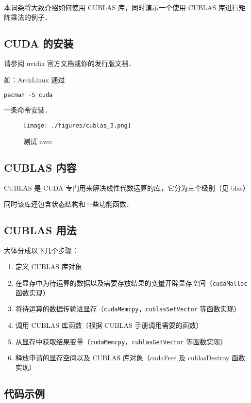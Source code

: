 
本词条将大致介绍如何使用 CUBLAS 库，同时演示一个使用 CUBLAS 库进行矩阵乘法的例子．
\subsection{CUDA 的安装}
请参阅 nvidia 官方文档或你的发行版文档．

如：ArchLinux 通过
\begin{lstlisting}[language=cpp]
pacman -S cuda
\end{lstlisting}
一条命令安装．

\begin{figure}[ht]
\centering
\texttt{[image: ./figures/cublas\_3.png]}
\caption{测试 nvcc} \label{cublas_fig3}
\end{figure}

\subsection{CUBLAS 内容}%

CUBLAS 是 CUDA 专门用来解决线性代数运算的库，它分为三个级别（见 blas）

同时该库还包含状态结构和一些功能函数．

\subsection{CUBLAS 用法}%

大体分成以下几个步骤：

\begin{enumerate}
  \item 定义 CUBLAS 库对象 
  \item  在显存中为待运算的数据以及需要存放结果的变量开辟显存空间（\verb|cudaMalloc| 函数实现）
  \item  将待运算的数据传输进显存（\verb|cudaMemcpy|，\verb|cublasSetVector| 等函数实现）
  \item 调用 CUBLAS 库函数（根据 CUBLAS 手册调用需要的函数）
  \item 从显存中获取结果变量（\verb|cudaMemcpy|，\verb|cublasGetVector| 等函数实现）
  \item  释放申请的显存空间以及 CUBLAS 库对象（cudaFree 及 cublasDestroy 函数实现）
\end{enumerate}

\subsection{代码示例}%

